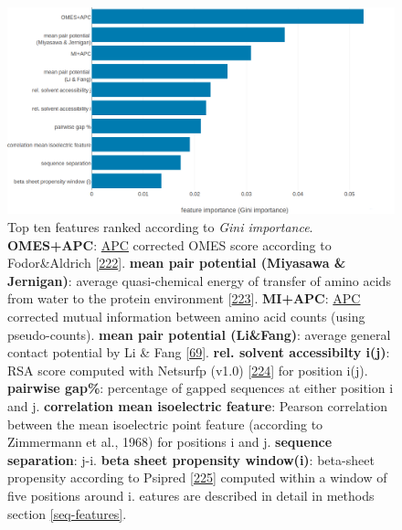 \documentclass[11pt,a4paper,twoside]{book}
\theoremstyle{definition}
\theoremstyle{definition}
\theoremstyle{remark}
\begin{document}
\begin{figure}
\includegraphics[width=1\linewidth]{img/random_forest_contact_prior/feature_random_forest_optimalhyperparameters_topfeatures} \caption{Top ten features ranked according to
\emph{Gini importance}. \textbf{OMES+APC}:
\protect\hyperlink{abbrev}{APC} corrected OMES score according to
Fodor\&Aldrich {[}\protect\hyperlink{ref-Fodor2004a}{222}{]}.
\textbf{mean pair potential (Miyasawa \& Jernigan)}: average
quasi-chemical energy of transfer of amino acids from water to the
protein environment {[}\protect\hyperlink{ref-Miyazawa1999a}{223}{]}.
\textbf{MI+APC}: \protect\hyperlink{abbrev}{APC} corrected mutual
information between amino acid counts (using pseudo-counts).
\textbf{mean pair potential (Li\&Fang)}: average general contact
potential by Li \& Fang {[}\protect\hyperlink{ref-Li2011}{69}{]}.
\textbf{rel. solvent accessibilty i(j)}: RSA score computed with
Netsurfp (v1.0) {[}\protect\hyperlink{ref-Petersen2009a}{224}{]} for
position i(j). \textbf{pairwise gap\%}: percentage of gapped sequences
at either position i and j. \textbf{correlation mean isoelectric
feature}: Pearson correlation between the mean isoelectric point feature
(according to Zimmermann et al., 1968) for positions i and j.
\textbf{sequence separation}: \textbar{}j-i\textbar{}. \textbf{beta
sheet propensity window(i)}: beta-sheet propensity according to Psipred
{[}\protect\hyperlink{ref-Jones1999}{225}{]} computed within a window of
five positions around i. eatures are described in detail in methods
section \ref{seq-features}.}\label{fig:rf-feature-importance}
\end{figure}
\end{document}
